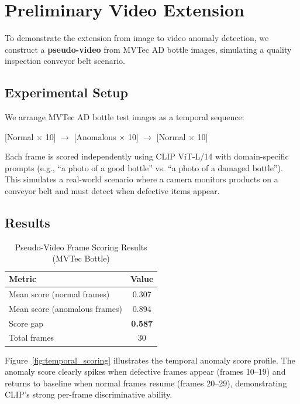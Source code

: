 \section{Preliminary Video Extension}
\label{sec:video_experiment}

To demonstrate the extension from image to video anomaly detection, we construct a \textbf{pseudo-video} from MVTec AD bottle images, simulating a quality inspection conveyor belt scenario.

\subsection{Experimental Setup}

We arrange MVTec AD bottle test images as a temporal sequence:
\begin{center}
[Normal $\times$ 10] $\rightarrow$ [Anomalous $\times$ 10] $\rightarrow$ [Normal $\times$ 10]
\end{center}

Each frame is scored independently using CLIP ViT-L/14 with domain-specific prompts (e.g., ``a photo of a good bottle'' vs. ``a photo of a damaged bottle''). This simulates a real-world scenario where a camera monitors products on a conveyor belt and must detect when defective items appear.

\subsection{Results}

\begin{table}[h]
\centering
\caption{Pseudo-Video Frame Scoring Results (MVTec Bottle)}
\label{tab:video_results}
\renewcommand{\arraystretch}{1.2}
\begin{tabular}{@{} l c @{}}
\toprule
\textbf{Metric} & \textbf{Value} \\
\midrule
Mean score (normal frames) & 0.307 \\
Mean score (anomalous frames) & 0.894 \\
Score gap & \textbf{0.587} \\
Total frames & 30 \\
\bottomrule
\end{tabular}
\end{table}

Figure~\ref{fig:temporal_scoring} illustrates the temporal anomaly score profile. The anomaly score clearly spikes when defective frames appear (frames 10--19) and returns to baseline when normal frames resume (frames 20--29), demonstrating CLIP's strong per-frame discriminative ability.

